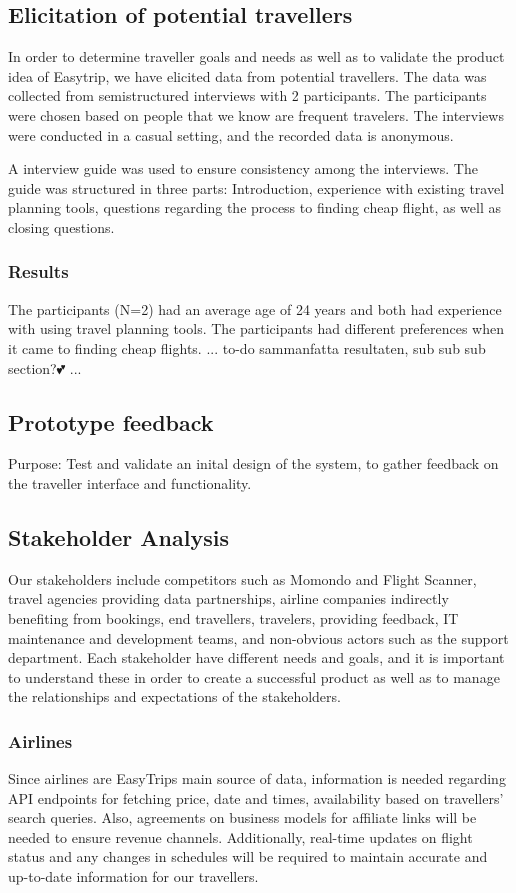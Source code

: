 \subsection{Elicitation of potential travellers}
In order to determine traveller goals and needs as well as to validate the product idea of Easytrip, we have elicited data from potential travellers. The data was collected from semistructured interviews with 2 participants. The participants were chosen based on people that we know are frequent travelers. The interviews were conducted in a casual setting, and the recorded data is anonymous.

A interview guide was used to ensure consistency among the interviews. The guide was structured in three parts: Introduction, experience with existing travel planning tools, questions regarding the process to finding cheap flight, as well as closing questions. 

\subsubsection{Results}
The participants (N=2) had an average age of 24 years and both had experience with using travel planning tools. The participants had different preferences when it came to finding cheap flights. 
... to-do sammanfatta resultaten, sub sub sub section?💕 ...

\subsection{Prototype feedback}
Purpose: Test and validate an inital design of the system, to gather feedback on the traveller interface and functionality.

\subsection{Stakeholder Analysis}
Our stakeholders include competitors such as Momondo and Flight Scanner, travel agencies providing data partnerships, airline companies indirectly benefiting from bookings, end travellers, travelers, providing feedback, IT maintenance and development teams, and non-obvious actors such as the support department. Each stakeholder have different needs and goals, and it is important to understand these in order to create a successful product as well as to manage the relationships and expectations of the stakeholders.

\subsubsection{Airlines}
Since airlines are EasyTrips main source of data, information is needed regarding API endpoints for fetching price, date and times, availability based on travellers' search queries. Also, agreements on business models for affiliate links will be needed to ensure revenue channels. Additionally, real-time updates on flight status and any changes in schedules will be required to maintain accurate and up-to-date information for our travellers.

